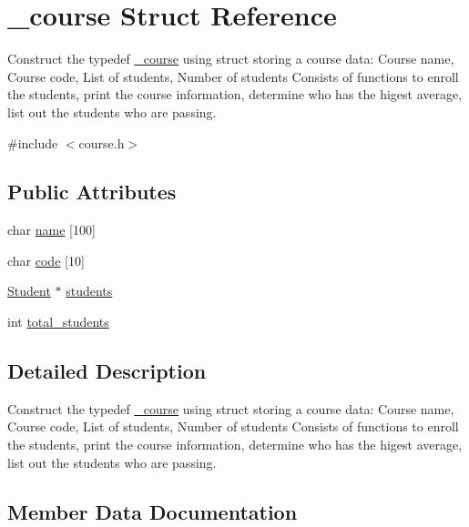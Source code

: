 \hypertarget{struct__course}{}\section{\+\_\+course Struct Reference}
\label{struct__course}


Construct the typedef \mbox{\hyperlink{struct__course}{\+\_\+course}} using struct storing a course data\+: Course name, Course code, List of students, Number of students Consists of functions to enroll the students, print the course information, determine who has the higest average, list out the students who are passing.  




{\ttfamily \#include $<$course.\+h$>$}

\subsection*{Public Attributes}
\begin{DoxyCompactItemize}
\item 
char \mbox{\hyperlink{struct__course_a8a6f7d2171f18b5d13e86913345f381d}{name}} \mbox{[}100\mbox{]}
\item 
char \mbox{\hyperlink{struct__course_ae86dc46bc4dfe126555e5560860b583f}{code}} \mbox{[}10\mbox{]}
\item 
\mbox{\hyperlink{student_8h_abcfb362c0eb3182c835992cf3d0c0dd3}{Student}} $\ast$ \mbox{\hyperlink{struct__course_a5cf448bc80f0f8c5f23402db23d41a00}{students}}
\item 
int \mbox{\hyperlink{struct__course_afd5e161f7cf358c13cc8aa868b462006}{total\+\_\+students}}
\end{DoxyCompactItemize}


\subsection{Detailed Description}
Construct the typedef \mbox{\hyperlink{struct__course}{\+\_\+course}} using struct storing a course data\+: Course name, Course code, List of students, Number of students Consists of functions to enroll the students, print the course information, determine who has the higest average, list out the students who are passing. 

\subsection{Member Data Documentation}
\mbox{\label{struct__course_ae86dc46bc4dfe126555e5560860b583f}} 

